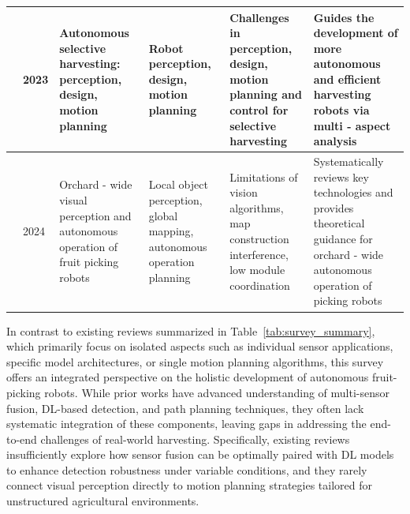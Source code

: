 \documentclass[a4paper,fleqn]{cas-dc}
\begin{document}
\begin{table}[ht]
\begin{tabular} {p{0.4cm}p{0.5cm}p{3cm}p{3.2cm}p{3cm}p{4.5cm}}
\cite{rajendran2024towards} & 2023 & Autonomous selective harvesting: perception, design, motion planning & Robot perception, design, motion planning & Challenges in perception, design, motion planning and control for selective harvesting & Guides the development of more autonomous and efficient harvesting robots via multi - aspect analysis \\ \midrule
\cite{mingyou2024orchard} & 2024 & Orchard - wide visual perception and autonomous operation of fruit picking robots & Local object perception, global mapping, autonomous operation planning & Limitations of vision algorithms, map construction interference, low module coordination & Systematically reviews key technologies and provides theoretical guidance for orchard - wide autonomous operation of picking robots \\ 
\bottomrule
\end{tabular}
\end{table}
\iffalse
In contrast to existing reviews summarized in Table~\ref{tab:survey_summary}, which primarily focus on isolated aspects such as individual sensor applications, specific model architectures, or single motion planning algorithms, this survey offers an integrated perspective on the holistic development of autonomous fruit-picking robots. While prior works have advanced understanding of multi-sensor fusion, DL-based detection, and path planning techniques, they often lack systematic integration of these components, leaving gaps in addressing the end-to-end challenges of real-world harvesting. Specifically, existing reviews insufficiently explore how sensor fusion can be optimally paired with DL models to enhance detection robustness under variable conditions, and they rarely connect visual perception directly to motion planning strategies tailored for unstructured agricultural environments.
\end{document}

